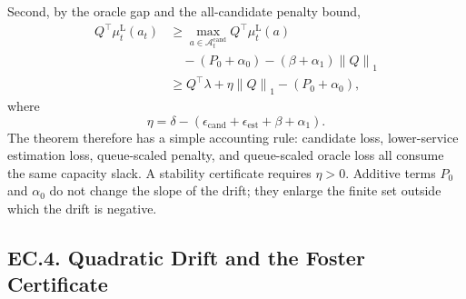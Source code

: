 \documentclass[opre,dblanonrev]{informs4}
\newcommand{\Acand}{\mathcal A^{\mathrm{cand}}}
\newcommand{\lowermu}{\mu^{\mathrm L}}
\newcommand{\normone}[1]{\left\|#1\right\|_1}
\begin{document}
Second, by the oracle gap and the all-candidate penalty bound,
\begin{equation}
  \label{eq:ec-selected-margin}
  \begin{aligned}
  Q^\top\lowermu_t(a_t)
  &\ge \max_{a\in\Acand_t}Q^\top\lowermu_t(a)\\
  &\quad{}-(P_0+\alpha_0)-(\beta+\alpha_1)\normone{Q}\\
  &\ge Q^\top\lambda+
     \eta\normone{Q}-(P_0+\alpha_0),
  \end{aligned}
\end{equation}
where
\begin{equation}
  \eta=\delta-(\epsilon_{\mathrm{cand}}+\epsilon_{\mathrm{est}}+\beta+\alpha_1).
\end{equation}
The theorem therefore has a simple accounting rule: candidate loss,
lower-service estimation loss, queue-scaled penalty, and queue-scaled oracle
loss all consume the same capacity slack.  A stability certificate requires
\(\eta>0\).  Additive terms \(P_0\) and \(\alpha_0\) do not change the slope of
the drift; they enlarge the finite set outside which the drift is negative.

\subsection*{EC.4. Quadratic Drift and the Foster Certificate}
\end{document}
